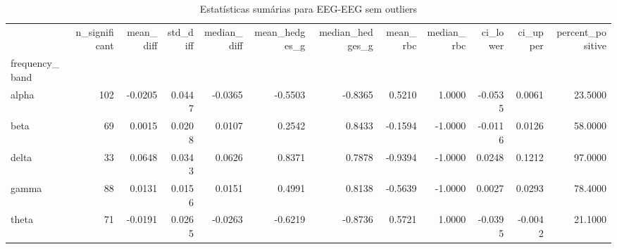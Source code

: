 \begin{table}[htbp]
\centering
\begin{tabular}{lrrrrrrrrrrr}
\toprule
 & n\_significant & mean\_diff & std\_diff & median\_diff & mean\_hedges\_g & median\_hedges\_g & mean\_rbc & median\_rbc & ci\_lower & ci\_upper & percent\_positive \\
frequency\_band &  &  &  &  &  &  &  &  &  &  &  \\
\midrule
alpha & 102 & -0.0205 & 0.0447 & -0.0365 & -0.5503 & -0.8365 & 0.5210 & 1.0000 & -0.0535 & 0.0061 & 23.5000 \\
beta & 69 & 0.0015 & 0.0208 & 0.0107 & 0.2542 & 0.8433 & -0.1594 & -1.0000 & -0.0116 & 0.0126 & 58.0000 \\
delta & 33 & 0.0648 & 0.0343 & 0.0626 & 0.8371 & 0.7878 & -0.9394 & -1.0000 & 0.0248 & 0.1212 & 97.0000 \\
gamma & 88 & 0.0131 & 0.0156 & 0.0151 & 0.4991 & 0.8138 & -0.5639 & -1.0000 & 0.0027 & 0.0293 & 78.4000 \\
theta & 71 & -0.0191 & 0.0265 & -0.0263 & -0.6219 & -0.8736 & 0.5721 & 1.0000 & -0.0395 & -0.0042 & 21.1000 \\
\bottomrule
\end{tabular}
\caption{Estatísticas sumárias para EEG-EEG sem outliers}
\label{tab:summary\_eeg\_eeg\_without}
\end{table}
